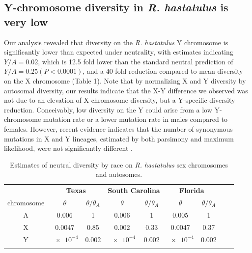 \documentclass[9pt,twocolumn,twoside]{gsajnl}
\begin{document}
\subsection*{Y-chromosome diversity in \textit{R. hastatulus} is very low}
Our analysis revealed that diversity on the \textit{R. hastatulus} Y chromosome is significantly lower than expected under neutrality, with estimates indicating $Y/A=0.02$, which is 12.5 fold lower than the standard neutral prediction of $Y/A = 0.25 (P<0.0001)$, and a 40-fold reduction compared to mean diversity on the X chromosome (Table 1). Note that by normalizing X and Y diversity by autosomal diversity, our results indicate that the X-Y difference we observed was not due to an elevation of X chromosome diversity, but a Y-specific diversity reduction. Conceivably, low diversity on the Y could arise from a low Y-chromosome mutation rate or a lower mutation rate in males compared to females. However, recent evidence indicates that the number of synonymous mutations in X and Y lineages, estimated by both parsimony and maximum likelihood, were not significantly different \citep{hough2014}. 




\begin{table}[t!]
\centering
\caption{Estimates of neutral diversity by race on \textit{R. hastatulus} sex chromosomes and autosomes.}
\begin{tabular}{ccccccccc}
\textbf{} & \multicolumn{2}{c}{\textbf{Texas}} & \multicolumn{2}{c}{\textbf{South Carolina}} & \multicolumn{2}{c}{\textbf{Florida}} \\
chromosome & $\theta$ & $\theta/\theta_{A}$ & $\theta$ & $\theta/\theta_{A}$ & $\theta$ & $\theta/\theta_{A}$ \\
\midrule
A & 0.006 & 1 & 0.006 & 1 & 0.005 & 1 \\    
X & 0.0047 & 0.85 & 0.002 & 0.33 & 0.0047 & 0.37 \\ 
Y & $\num{e-4}$ & 0.002 & $\num{e-4}$ & 0.002 & $\num{e-4}$ & 0.002 \\ 
\addlinespace

\bottomrule
\end{tabular}
\end{table}
\end{document}

